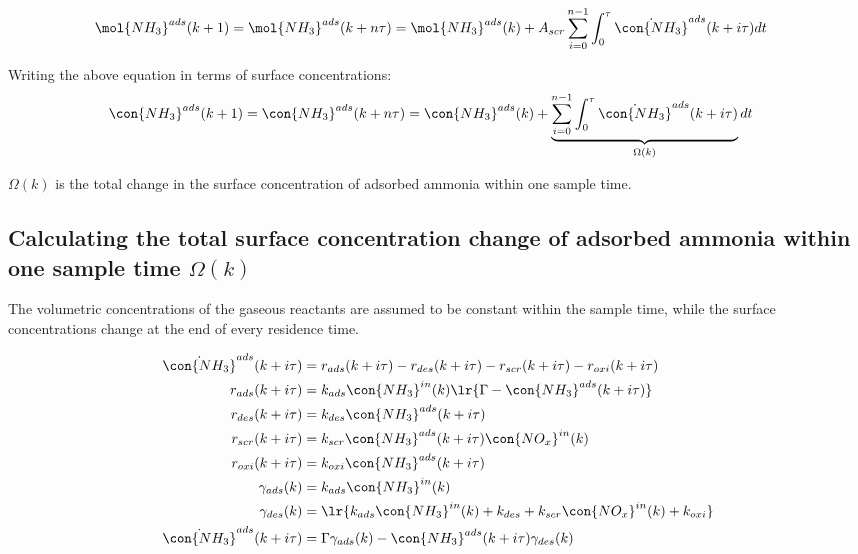 \begin{align*}
    \mol{NH_3}^{ads}(k + 1) = \mol{NH_3}^{ads} (k + n\tau) &= \mol{NH_3}^{ads} (k) + A_{scr} \sum_{i=0}^{n-1} \int_{0}^{\tau} \dot{\con{NH_3}}^{ads} (k + i\tau) dt
\end{align*}

Writing the above equation in terms of surface concentrations:
\begin{align*}
    \con{NH_3}^{ads}(k + 1) = \con{NH_3}^{ads} (k + n\tau) &= \con{NH_3}^{ads} (k) + \underbrace{\sum_{i=0}^{n-1} \int_{0}^{\tau} \dot{\con{NH_3}}^{ads} (k + i\tau)}_{\Omega(k)}   dt
\end{align*}

$\Omega(k)$ is the total change in the surface concentration of adsorbed ammonia
within one sample time.

\subsection{Calculating the total surface concentration change of adsorbed ammonia within one sample time $\Omega(k)$}

The volumetric concentrations of the gaseous reactants are assumed to be
constant within the sample time, while the surface concentrations change at the
end of every residence time.

\begin{align*}
    \dot{\con{NH_3}}^{ads} (k + i\tau) &= r_{ads} (k + i \tau) - r_{des} (k + i \tau) - r_{scr} (k + i \tau) - r_{oxi} (k + i \tau)\\
    r_{ads} (k + i \tau) &= k_{ads} \con{NH_3}^{in}(k) \lr{\Gamma - \con{NH_3}^{ads} (k + i \tau)}\\
    r_{des} (k + i \tau) &= k_{des} \con{NH_3}^{ads}(k + i \tau)\\
    r_{scr} (k + i \tau) &= k_{scr} \con{NH_3}^{ads}(k + i \tau) \con{NO_x}^{in}(k)\\
    r_{oxi} (k + i \tau) &= k_{oxi} \con{NH_3}^{ads}(k + i \tau)\\
    \gamma_{ads} (k) &= k_{ads} \con{NH_3}^{in}(k)\\
    \gamma_{des} (k) &= \lr{k_{ads} \con{NH_3}^{in}(k) + k_{des} + k_{scr} \con{NO_x}^{in}(k) + k_{oxi}}\\
    \dot{\con{NH_3}}^{ads} (k + i\tau) &= \Gamma \gamma_{ads} (k) - \con{NH_3}^{ads} (k + i \tau) \gamma_{des} (k)
\end{align*}

